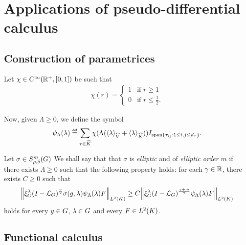 \chapter{Applications of pseudo-differential calculus}

\section{Construction of parametrices}

Let $\chi \in \SmoothFunctions {\R^+, [0, 1]}$ be such that
\begin{align*}
    \chi(r) =
    \begin{cases}
        1 & \text{if } r \geq 1\\
        0 & \text{if } r \leq \frac 1 2.
    \end{cases}
\end{align*}

Now, given $\Lambda \geq 0$,
we define the symbol
\begin{align*}
    \psi_\Lambda(\lambda)
    \defeq \sum_{\tau \in \dualGroup \CompactGroup}
    \chi(\Lambda(\JapaneseBracket \VectorSpace \lambda + \JapaneseBracket \CompactGroup \lambda)) \Id {\Span \{\tau_{i j} : 1 \leq i, j \leq \dimRep \tau\}}.
\end{align*}

\begin{definition}[Ellipticity]
\label{definition:ellipticity}
    Let $\sigma \in \SymbolClass m {\rho, \delta}$
    We shall say that that $\sigma$ is \emph{elliptic} and of \emph{elliptic order} $m$
    if there exists $\Lambda \geq 0$ such that the following property holds:
    for each $\gamma \in \R$,
    there exists $C \geq 0$ such that
    \begin{align*}
        \norm [\Lebesgue 2 \CompactGroup] {\Rep \lambda \BesselPotential \gamma \sigma(g, \lambda) \psi_\Lambda(\lambda) F}
        \geq C
        \norm [\Lebesgue 2 \CompactGroup] {\Rep \lambda \BesselPotential {\gamma + m} \psi_\Lambda(\lambda) F}
    \end{align*}
    holds for every $g \in \Group$, $\lambda \in \Group$
    and every $F \in \Lebesgue 2 \CompactGroup$.
\end{definition}

\section{Functional calculus}
